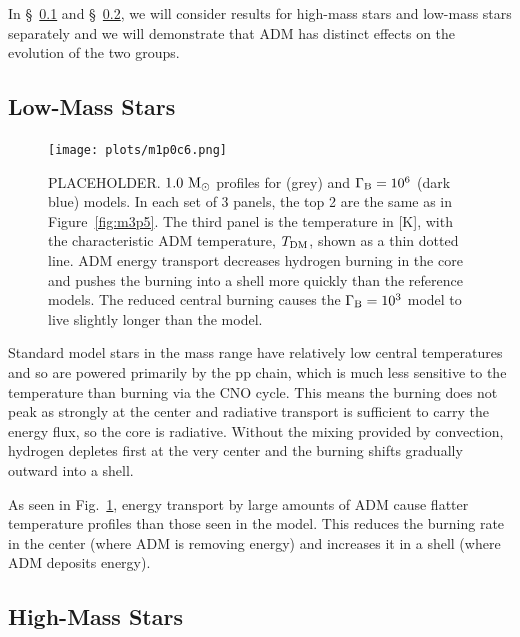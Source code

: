 \documentclass[useAMS,usenatbib]{mnras}
\begin{document}
In \S~\ref{sub:lowmass} and \S~\ref{sub:highmass}, we will consider results for high-mass stars and low-mass stars separately and we will demonstrate that ADM has distinct effects on the evolution of the two groups.


\subsection{Low-Mass Stars}
\label{sub:lowmass}

  \begin{figure}
    \centering
    \texttt{[image: plots/m1p0c6.png]}
    \caption{PLACEHOLDER. $1.0 \ \mathrm{M}_{\odot}$ profiles for \nodm (grey) and $\Gamma_\mathrm{B} = 10^{6}$ (dark blue) models. In each set of 3 panels, the top 2 are the same as in Figure~\ref{fig:m3p5}. The third panel is the temperature in [K], with the characteristic ADM temperature, $T_{\mathrm{DM}}$, shown as a thin dotted line. ADM energy transport decreases hydrogen burning in the core and pushes the burning into a shell more quickly than the reference models. The reduced central burning causes the $\Gamma_\mathrm{B} = 10^{3}$ model to live slightly longer than the \nodm model.
    }
    \label{fig:m1p0c6}
  \end{figure}


Standard model stars in the mass range \mrangelow have relatively low central temperatures and so are powered primarily by the pp chain, which is much less sensitive to the temperature than burning via the CNO cycle. This means the burning does not peak as strongly at the center and radiative transport is sufficient to carry the energy flux, so the core is radiative. Without the mixing provided by convection, hydrogen depletes first at the very center and the burning shifts gradually outward into a shell.

As seen in Fig.~\ref{fig:m1p0c6}, energy transport by large amounts of ADM cause flatter temperature profiles than those seen in the \nodm model. This reduces the burning rate in the center (where ADM is removing energy) and increases it in a shell (where ADM deposits energy).


\subsection{High-Mass Stars}
\label{sub:highmass}
\end{document}
